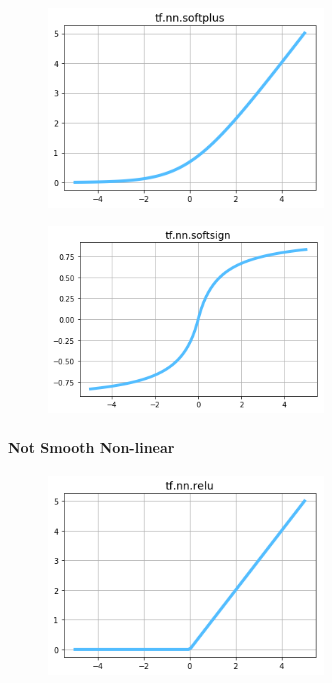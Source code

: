 \begin{figure}
\centering
\includegraphics[width=0.65\textwidth]{./sync_imgs/act/smooth/softplus.png}
\label{fig:act_smooth_softplus}
\end{figure}

\begin{figure}
\centering
\includegraphics[width=0.65\textwidth]{./sync_imgs/act/smooth/softsign.png}
\label{fig:act_smooth_softsign}
\end{figure}


\paragraph{Not Smooth Non-linear}

\begin{figure}
\centering
\includegraphics[width=0.65\textwidth]{./sync_imgs/act/notsmooth/relu.png}
\label{fig:act_notsmooth_relu}
\end{figure}

